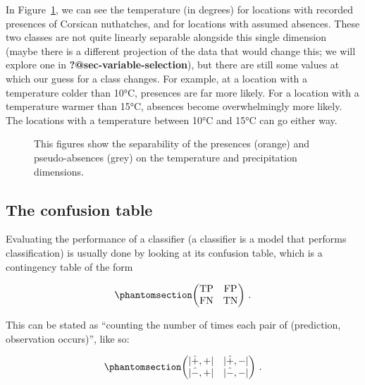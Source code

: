 \documentclass[
  letterpaper,
]{scrbook}
\begin{document}
In Figure~\ref{fig-classification-separability}, we can see the
temperature (in degrees) for locations with recorded presences of
Corsican nuthatches, and for locations with assumed absences. These two
classes are not quite linearly separable alongside this single dimension
(maybe there is a different projection of the data that would change
this; we will explore one in \textbf{?@sec-variable-selection}), but
there are still some values at which our guess for a class changes. For
example, at a location with a temperature colder than 10°C, presences
are far more likely. For a location with a temperature warmer than 15°C,
absences become overwhelmingly more likely. The locations with a
temperature between 10°C and 15°C can go either way.

\begin{figure}[pbt]


\caption{\label{fig-classification-separability}This figures show the
separability of the presences (orange) and pseudo-absences (grey) on the
temperature and precipitation dimensions.}

\end{figure}%

\subsection{The confusion table}\label{the-confusion-table}

Evaluating the performance of a classifier (a classifier is a model that
performs classification) is usually done by looking at its confusion
table, which is a contingency table of the form

\begin{equation}\phantomsection\label{eq-classification-confusion}{
\begin{pmatrix}
\text{TP} & \text{FP}\\
\text{FN} & \text{TN} 
\end{pmatrix} \,.
}\end{equation}

This can be stated as ``counting the number of times each pair of
(prediction, observation occurs)'', like so:

\begin{equation}\phantomsection\label{eq-classification-explain}{
\begin{pmatrix}
|\hat +, +| & |\hat +, -|\\
|\hat -, +| & |\hat -, -| 
\end{pmatrix} \,.
}\end{equation}
\end{document}
